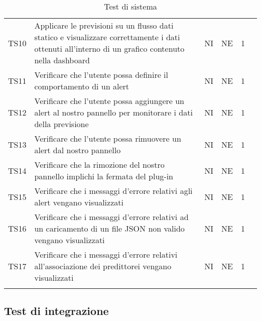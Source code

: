 \begin{longtable} {
	>{}p{12mm}
	>{}p{79.5mm}
	>{}p{9mm}
	>{}p{8mm}
	>{}p{14mm}
	>{}p{0mm}}
	TS10 & Applicare le previsioni su un flusso dati statico e visualizzare correttamente i dati ottenuti all'interno di un grafico contenuto nella dashboard\glo & NI & NE  & 1 & \TBstrut \\ [2mm]
	TS11 & Verificare che l'utente possa definire il comportamento di un alert & NI & NE  & 1 & \TBstrut \\ [2mm]
	TS12 & Verificare che l'utente possa aggiungere un alert al nostro pannello per monitorare i dati della previsione & NI & NE  & 1 & \TBstrut \\ [2mm]
	TS13 & Verificare che l'utente possa rimuovere un alert dal nostro pannello & NI & NE  & 1 & \TBstrut \\ [2mm]
	TS14 & Verificare che la rimozione del nostro pannello implichi la fermata del plug-in & NI & NE  & 1 & \TBstrut \\ [2mm]
	TS15 & Verificare che i messaggi d'errore relativi agli alert vengano visualizzati & NI & NE  & 1 & \TBstrut \\ [2mm]
	TS16 & Verificare che i messaggi d'errore relativi ad un caricamento di un file JSON non valido vengano visualizzati & NI & NE  & 1 & \TBstrut \\ [2mm]
	TS17 & Verificare che i messaggi d'errore relativi all'associazione dei predittorei vengano visualizzati & NI & NE  & 1 & \TBstrut \\ [2mm]
	\rowcolor{white}
	\caption{Test di sistema}
\end{longtable}


\subsection{Test di integrazione}

